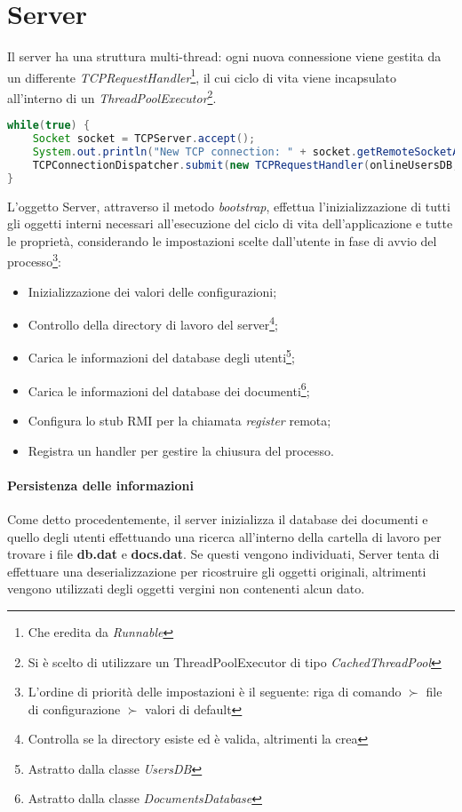 \section{Server}
Il server ha una struttura multi-thread: ogni nuova connessione viene gestita da un differente \textit{TCPRequestHandler}\footnote{Che eredita da \textit{Runnable}}, il cui ciclo di vita viene incapsulato all'interno di un \textit{ThreadPoolExecutor}\footnote{Si è scelto di utilizzare un ThreadPoolExecutor di tipo \textit{CachedThreadPool}}. 

\begin{lstlisting}[caption="Gestione di una nuova connessione", language=java]
while(true) {
	Socket socket = TCPServer.accept();
	System.out.println("New TCP connection: " + socket.getRemoteSocketAddress().toString());
	TCPConnectionDispatcher.submit(new TCPRequestHandler(onlineUsersDB, usersDB, documentDatabase, cdaManager, socket));
}
\end{lstlisting}

L'oggetto Server, attraverso il metodo \textit{bootstrap}, effettua l'inizializzazione di tutti gli oggetti interni necessari all'esecuzione del ciclo di vita dell'applicazione e tutte le proprietà, considerando le impostazioni scelte dall'utente in fase di avvio del processo\footnote{L'ordine di priorità delle impostazioni è il seguente: riga di comando $\succ$ file di configurazione $\succ$ valori di default}:
\begin{itemize}
	\item Inizializzazione dei valori delle configurazioni;
	\item Controllo della directory di lavoro del server\footnote{Controlla se la directory esiste ed è valida, altrimenti la crea};
	\item Carica le informazioni del database degli utenti\footnote{Astratto dalla classe \textit{UsersDB}};
	\item Carica le informazioni del database dei documenti\footnote{Astratto dalla classe \textit{DocumentsDatabase}};
	\item Configura lo stub RMI per la chiamata \textit{register} remota;
	\item Registra un handler per gestire la chiusura del processo.
\end{itemize}

\paragraph{Persistenza delle informazioni}
Come detto procedentemente, il server inizializza il database dei documenti e quello degli utenti effettuando una ricerca all'interno della cartella di lavoro per trovare i file \textbf{db.dat} e \textbf{docs.dat}. Se questi vengono individuati, Server tenta di effettuare una deserializzazione per ricostruire gli oggetti originali, altrimenti vengono utilizzati degli oggetti vergini non contenenti alcun dato.